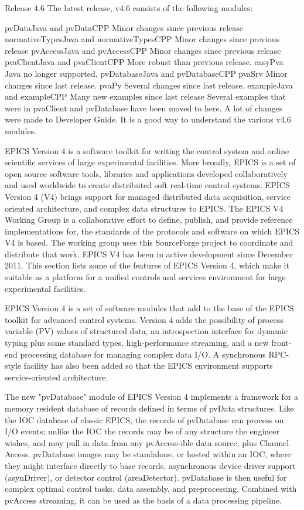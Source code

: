 \documentclass[11pt
  , a4paper
  , article
  , oneside
]{memoir}
\begin{document}
Release 4.6
The latest release, v4.6 consists of the following modules:

pvDataJava and pvDataCPP
Minor changes since previous release
normativeTypesJava and normativeTypesCPP
Minor changes since previous release
pvAccessJava and pvAccessCPP
Minor changes since previous release
pvaClientJava and pvaClientCPP
More robust than previous release.
easyPva Java no longer supported.
pvDatabaseJava and pvDatabaseCPP
pvaSrv
Minor changes since last release.
pvaPy
Several changes since last release.
exampleJava and exampleCPP
Many new examples since last release
Several examples that were in pvaClient and pvDatabase have been moved to here.
A lot of changes were made to Developer Guide. It is a good way to understand the various v4.6 modules.

EPICS Version 4 is a software toolkit for writing the control system and online scientific services of large experimental facilities. More broadly, EPICS is a set of open source software tools, libraries and applications developed collaboratively and used worldwide to create distributed soft real-time control systems. EPICS Version 4 (V4) brings support for managed distributed data acquisition, service oriented architecture, and complex data structures to EPICS. The EPICS V4 Working Group is a collaborative effort to define, publish, and provide reference implementations for, the standards of the protocols and software on which EPICS V4 is based. The working group uses this SourceForge project to coordinate and distribute that work. EPICS V4 has been in active development since December 2011.
This section lists some of the features of EPICS Version 4, which make it suitable as a platform for a unified controls and services environment for large experimental facilities.

EPICS Version 4 is a set of software modules that add to the base of the EPICS toolkit for advanced control systems. Version 4 adds the possibility of process variable (PV) values of structured data, an introspection interface for dynamic typing plus some standard types, high-performance streaming, and a new front-end processing database for managing complex data I/O. A synchronous RPC-style facility has also been added so that the EPICS environment supports service-oriented architecture.

The new "pvDatabase" module of EPICS Version 4 implements a framework for a memory resident database of records defined in terms of pvData structures. Like the IOC database of classic EPICS, the records of pvDatabase can process on I/O events; unlike the IOC the records may be of any structure the engineer wishes, and may pull in data from any pvAccess-ible data source, plus Channel Access. pvDatabase images may be standalone, or hosted within an IOC, where they might interface directly to base records, asynchronous device driver support (asynDriver), or detector control (areaDetector). pvDatabase is then useful for complex optimal control tasks, data assembly, and preprocessing. Combined with pvAccess streaming, it can be used as the basis of a data processing pipeline.
\end{document}
